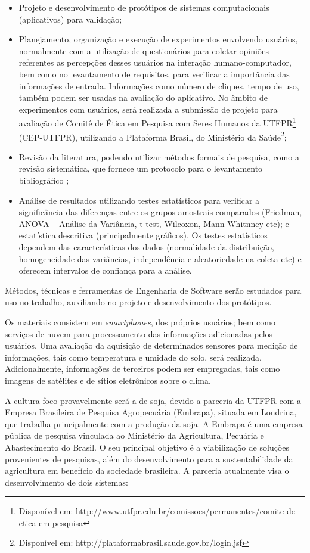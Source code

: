 \documentclass[12pt]{article}
\begin{document}
\begin{itemize}
	\item Projeto e desenvolvimento de protótipos de sistemas computacionais (aplicativos) para validação;
	\item Planejamento, organização e execução de experimentos envolvendo usuários, normalmente com a utilização de questionários para coletar opiniões referentes as percepções desses usuários na interação humano-computador, bem como no levantamento de requisitos, para verificar a importância das informações de entrada. Informações como número de cliques, tempo de uso, também podem ser usadas na avaliação do aplicativo. No âmbito de experimentos com usuários, será realizada a submissão de projeto para avaliação de Comitê de Ética em Pesquisa com Seres Humanos da UTFPR\footnote{Disponível em: http://www.utfpr.edu.br/comissoes/permanentes/comite-de-etica-em-pesquisa} (CEP-UTFPR), utilizando a Plataforma Brasil, do Ministério da Saúde\footnote{Disponível em: http://plataformabrasil.saude.gov.br/login.jsf};
	\item Revisão da literatura, podendo utilizar métodos formais de pesquisa, como a revisão sistemática, que fornece um protocolo para o levantamento bibliográfico \cite{Kitchenham:2004};
	\item Análise de resultados utilizando testes estatísticos para verificar a significância das diferenças entre os grupos amostrais comparados (Friedman, ANOVA – Análise da Variância, t-test, Wilcoxon, Mann-Whitnney etc); e estatística descritiva (principalmente gráficos). Os testes estatísticos dependem das características dos dados (normalidade da distribuição, homogeneidade das variâncias, independência e aleatoriedade na coleta etc) e oferecem intervalos de confiança para a análise.
\end{itemize}

Métodos, técnicas e ferramentas de Engenharia de Software serão estudados para uso no trabalho, auxiliando no projeto e desenvolvimento dos protótipos.

Os materiais consistem em \textit{smartphones}, dos próprios usuários; bem como serviços de nuvem para processamento das informações adicionadas pelos usuários. Uma avaliação da aquisição de determinados sensores para medição de informações, tais como temperatura e umidade do solo, será realizada. Adicionalmente, informações de terceiros podem ser empregadas, tais como imagens de satélites e de sítios eletrônicos sobre o clima. 		

A cultura foco provavelmente será a de soja, devido a parceria da UTFPR com a Empresa Brasileira de Pesquisa Agropecuária (Embrapa), situada em Londrina, que trabalha principalmente com a produção da soja. A Embrapa é uma empresa pública de pesquisa vinculada ao Ministério da Agricultura, Pecuária e Abastecimento do Brasil. O seu principal objetivo é a viabilização de soluções provenientes de pesquisas, além do desenvolvimento para a sustentabilidade da agricultura em benefício da sociedade brasileira. A parceria atualmente visa o desenvolvimento de dois sistemas:
\end{document}
